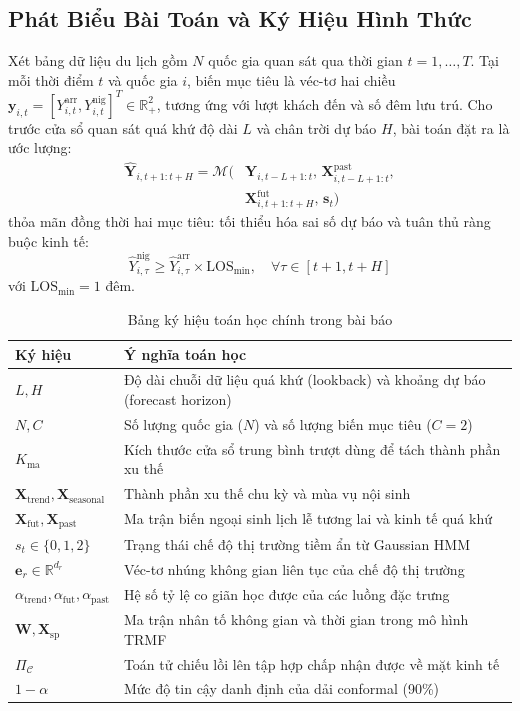 \documentclass[10pt,journal,compsoc]{IEEEtran}
\begin{document}
\subsection{Phát Biểu Bài Toán và Ký Hiệu Hình Thức}
Xét bảng dữ liệu du lịch gồm $N$ quốc gia quan sát qua thời gian $t = 1, \dots, T$. Tại mỗi thời điểm $t$ và quốc gia $i$, biến mục tiêu là véc-tơ hai chiều $\mathbf{y}_{i, t} = [Y_{i, t}^{\text{arr}}, Y_{i, t}^{\text{nig}}]^T \in \mathbb{R}_+^2$, tương ứng với lượt khách đến và số đêm lưu trú. Cho trước cửa sổ quan sát quá khứ độ dài $L$ và chân trời dự báo $H$, bài toán đặt ra là ước lượng:
\begin{equation}
\begin{aligned}
\hat{\mathbf{Y}}_{i, t+1:t+H} = \mathcal{M}\big( & \mathbf{Y}_{i, t-L+1:t}, \, \mathbf{X}_{i, t-L+1:t}^{\text{past}}, \\
& \mathbf{X}_{i, t+1:t+H}^{\text{fut}}, \, \mathbf{s}_t\big)
\end{aligned}
\end{equation}
thỏa mãn đồng thời hai mục tiêu: tối thiểu hóa sai số dự báo và tuân thủ ràng buộc kinh tế:
\begin{equation}
\hat{Y}_{i, \tau}^{\text{nig}} \ge \hat{Y}_{i, \tau}^{\text{arr}} \times \text{LOS}_{\min}, \quad \forall \tau \in [t+1, t+H]
\end{equation}
với $\text{LOS}_{\min} = 1$ đêm.
\begin{table}[!htbp]
\centering
\caption{Bảng ký hiệu toán học chính trong bài báo}
\label{tab:notations}
\small
\setlength{\tabcolsep}{3pt}
\renewcommand{\arraystretch}{1.0}
\begin{tabular}{p{2.35cm}p{6.05cm}}
\toprule
\textbf{Ký hiệu} & \textbf{Ý nghĩa toán học} \\
\midrule
$L, H$ & Độ dài chuỗi dữ liệu quá khứ (lookback) và khoảng dự báo (forecast horizon) \\
$N, C$ & Số lượng quốc gia ($N$) và số lượng biến mục tiêu ($C=2$) \\
$K_{\text{ma}}$ & Kích thước cửa sổ trung bình trượt dùng để tách thành phần xu thế \\
$\mathbf{X}_{\text{trend}}, \mathbf{X}_{\text{seasonal}}$ & Thành phần xu thế chu kỳ và mùa vụ nội sinh \\
$\mathbf{X}_{\text{fut}}, \mathbf{X}_{\text{past}}$ & Ma trận biến ngoại sinh lịch lễ tương lai và kinh tế quá khứ \\
$s_t \in \{0, 1, 2\}$ & Trạng thái chế độ thị trường tiềm ẩn từ Gaussian HMM \\
$\mathbf{e}_r \in \mathbb{R}^{d_r}$ & Véc-tơ nhúng không gian liên tục của chế độ thị trường \\
$\alpha_{\text{trend}}, \alpha_{\text{fut}}, \alpha_{\text{past}}$ & Hệ số tỷ lệ co giãn học được của các luồng đặc trưng \\
$\mathbf{W}, \mathbf{X}_{\text{sp}}$ & Ma trận nhân tố không gian và thời gian trong mô hình TRMF \\
$\Pi_{\mathcal{C}}$ & Toán tử chiếu lồi lên tập hợp chấp nhận được về mặt kinh tế \\
$1 - \alpha$ & Mức độ tin cậy danh định của dải conformal (90\%) \\
\bottomrule
\end{tabular}
\end{table}
\end{document}
